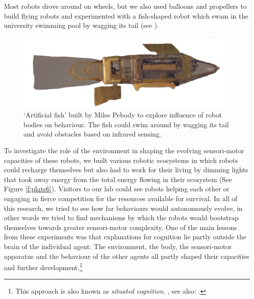 Most robots drove around on wheels, but we also used balloons and propellers to build 
flying robots and experimented with a fish-shaped robot which swam in the university swimming pool by wagging 
its tail (see ). 


\begin{figure}[htbp]
  \centerline{\includegraphics[width=.85\textwidth]{chap1/figs/fish}}
\caption{ `Artificial fish' built by Miles Pebody to explore influence of robot bodies on behaviour. The fish could swim around by wagging 
its tail and avoid obstacles based on infrared sensing.}
\label{f:plate4}
\end{figure}

To investigate the role of the environment in shaping the
evolving sensori-motor capacities of these robots, 
we built various robotic 
ecosystems in which robots could recharge themselves but also
had to work for their living by 
dimming lights that took away energy from the total energy 
flowing in their ecosystem  (See Figure \ref{f:plate6}). Visitors
to our lab could see robots helping each other or 
engaging in fierce competition for
the resources available for survival. In all of this
research, we tried to see how far behaviours would
autonomously evolve, in other words we tried to find 
mechanisms by which the robots would bootstrap themselves 
towards greater sensori-motor complexity. One of the 
main lessons from these experiments was that 
explanations for cognition lie partly outside the brain 
of the individual agent: The environment, the body, the 
sensori-motor apparatus and the behaviour of the other 
agents all partly shaped their capacities and 
further development.\footnote{This approach is also known as {\it situated cognition}. 
\cite{Clancey:1997}, see also: \cite{Varela:1991}.}


